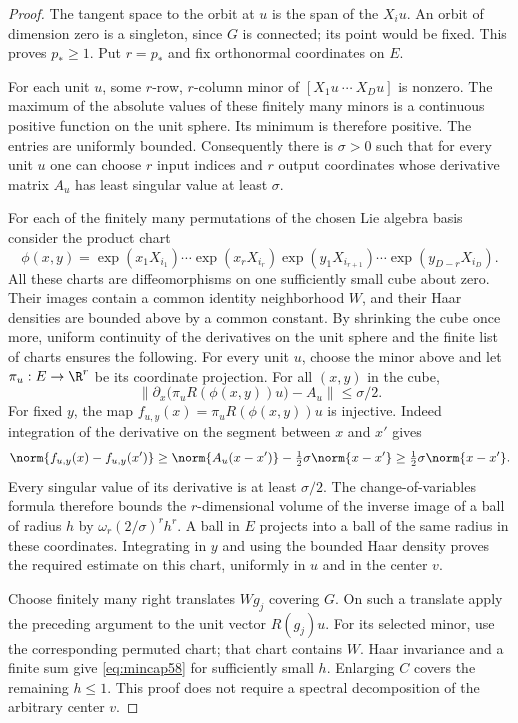 \begin{proof}
The tangent space to the orbit at $u$ is the span of the $X_i u$.
An orbit of dimension zero is a singleton, since $G$ is connected; its
point would be fixed. This proves $p_*\ge1$. Put $r=p_*$ and fix
orthonormal coordinates on $E$.

For each unit $u$, some $r$-row, $r$-column minor of
$[X_1u\ \cdots\ X_Du]$ is nonzero. The maximum of the absolute values
of these finitely many minors is a continuous positive function on the
unit sphere. Its minimum is therefore positive. The entries are uniformly
bounded. Consequently there is $\sigma>0$ such that for every unit $u$
one can choose $r$ input indices and $r$ output coordinates whose derivative
matrix $A_u$ has least singular value at least $\sigma$.

For each of the finitely many permutations of the chosen Lie algebra
basis consider the product chart
\[
 \phi(x,y)=\exp(x_1X_{i_1})\cdots\exp(x_rX_{i_r})
            \exp(y_1X_{i_{r+1}})\cdots\exp(y_{D-r}X_{i_D}).
\]
All these charts are diffeomorphisms on one sufficiently small cube about
zero. Their images contain a common identity neighborhood $W$, and their
Haar densities are bounded above by a common constant. By shrinking the
cube once more, uniform continuity of the derivatives on the unit sphere
and the finite list of charts ensures the following. For every unit $u$,
choose the minor above and let $\pi_u:E\to\R^r$ be its coordinate
projection. For all $(x,y)$ in the cube,
\begin{equation}\label{eq:submersion58}
 \left\|\partial_x\bigl(\pi_u R(\phi(x,y))u\bigr)-A_u\right\|
                                                    \le\sigma/2.
\end{equation}
For fixed $y$, the map $f_{u,y}(x)=\pi_u R(\phi(x,y))u$ is injective.
Indeed integration of the derivative on the segment between $x$ and
$x'$ gives
\[
 \norm{f_{u,y}(x)-f_{u,y}(x')}
       \ge\norm{A_u(x-x')}-\tfrac12\sigma\norm{x-x'}
       \ge\tfrac12\sigma\norm{x-x'}.
\]
Every singular value of its derivative is at least $\sigma/2$.
The change-of-variables formula therefore bounds the $r$-dimensional
volume of the inverse image of a ball of radius $h$ by
$\omega_r(2/\sigma)^r h^r$. A ball in $E$ projects into a ball of the
same radius in these coordinates. Integrating in $y$ and using the bounded
Haar density proves the required estimate on this chart, uniformly in
$u$ and in the center $v$.

Choose finitely many right translates $Wg_j$ covering $G$. On such a
translate apply the preceding argument to the unit vector $R(g_j)u$.
For its selected minor, use the corresponding permuted chart; that chart
contains $W$. Haar invariance and a finite sum give \eqref{eq:mincap58}
for sufficiently small $h$. Enlarging $C$ covers the remaining
$h\le1$. This proof does not require a spectral decomposition of the
arbitrary center $v$.


\end{proof}
